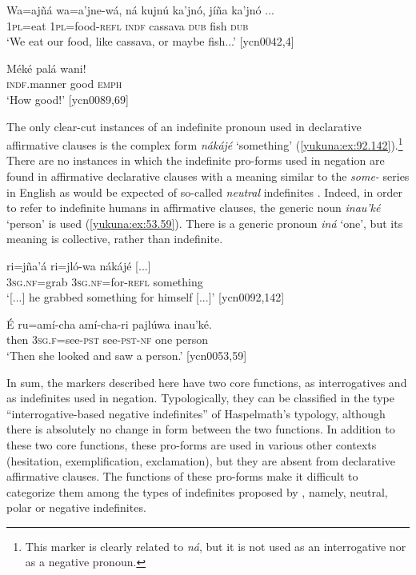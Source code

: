 \documentclass[output=paper,colorlinks,citecolor=brown]{langscibook}
\begin{document}
\ea\label{yukuna:ex:42.4}
\gll Wa=ajñá wa=a'jne-wá, ná kujnú ka'jnó, jíña ka'jnó {...}  \\
\textsc{1pl}=eat \textsc{1pl=}food-\textsc{refl} \textsc{indf} cassava \textsc{dub} fish \textsc{dub} \\
\glt ‘We eat our food, like cassava, or maybe fish...’ [ycn0042,4]
\z

\ea\label{yukuna:ex:89.69}
\gll Méké palá wani! \\
\textsc{indf}.manner good \textsc{emph}  \\
\glt ‘How good!’ [ycn0089,69]
\z

The only clear-cut instances of an indefinite pronoun used in declarative affirmative clauses is the complex form \textit{nákájé} ‘something’ (\ref{yukuna:ex:92.142}).\footnote{This marker is clearly related to \textit{ná}, but it is not used as an interrogative nor as a negative pronoun.} There are no instances in which the indefinite pro-forms used in negation are found in affirmative declarative clauses with a meaning similar to the \textit{some-} series in English as would be expected of so-called \textit{neutral} indefinites \citep{AuweraAlsenoy2018}. Indeed, in order to refer to indefinite humans in affirmative clauses, the generic noun \textit{inau'ké} ‘person’ is used (\ref{yukuna:ex:53.59}). There is a generic pronoun \textit{iná} ‘one’, but its meaning is collective, rather than indefinite.  

\ea\label{yukuna:ex:92.142}
\gll [...] ri=jña'á ri=jló-wa nákájé [...] \\
{} \textsc{3sg.nf}=grab \textsc{3sg.nf}=for-\textsc{refl} something \\
\glt ‘[...] he grabbed something for himself [...]' [ycn0092,142]
\z

\ea\label{yukuna:ex:53.59}
\gll É ru=amí-cha amí-cha-ri pajlúwa inau'ké.\\
then \textsc{3sg.f}=see-\textsc{pst} see-\textsc{pst-nf} one person\\
\glt ‘Then she looked and saw a person.' [ycn0053,59]
\z

In sum, the markers described here have two core functions, as interrogatives and as indefinites used in negation. Typologically, they can be classified in the type “interrogative-based negative indefinites” of Haspelmath's \citeyear{Haspelmath2013-wals115} typology, although there is absolutely no change in form between the two functions. In addition to these two core functions, these pro-forms are used in various other contexts (hesitation, exemplification, exclamation), but they are absent from declarative affirmative clauses. The functions of these pro-forms make it difficult to categorize them among the types of indefinites proposed by \citet{Kahrel1996}, namely, neutral, polar or negative indefinites. 
\end{document}
